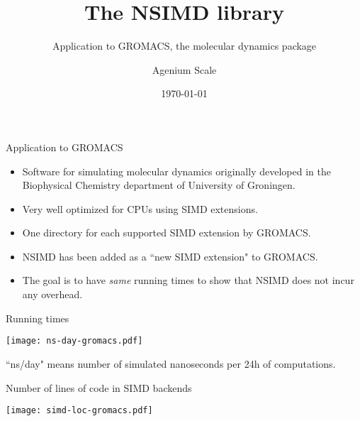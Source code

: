 \documentclass[shrink, compress, mathserif, 10pt, xcolor=dvipsnames,
               aspectratio=169]{beamer}
\title{The NSIMD library}
\subtitle{Application to GROMACS, the  molecular dynamics package}
\date{\today}
\author{Agenium Scale}
\begin{document}
\begin{frame}[plain]
  \maketitle
\end{frame}



\begin{frame}{Application to GROMACS}
  \begin{itemize}
    \item
      Software for simulating molecular dynamics originally developed in the
      Biophysical Chemistry department of University of Groningen.
    \vspace{1em}
    \item
      Very well optimized for CPUs using SIMD extensions.
    \vspace{1em}
    \item
      One directory for each supported SIMD extension by GROMACS.
    \vspace{1em}
    \item
      NSIMD has been added as a ``new SIMD extension" to GROMACS.
    \vspace{1em}
    \item
      The goal is to have \emph{same} running times to show that NSIMD does
      not incur any overhead.
  \end{itemize}
\end{frame}

\begin{frame}{Running times}
  \begin{center}
    \texttt{[image: ns-day-gromacs.pdf]}
  \end{center}

  ``ns/day" means number of simulated nanoseconds per 24h of computations.
\end{frame}

\begin{frame}{Number of lines of code in SIMD backends}
  \begin{center}
    \texttt{[image: simd-loc-gromacs.pdf]}
  \end{center}
\end{frame}
\end{document}
